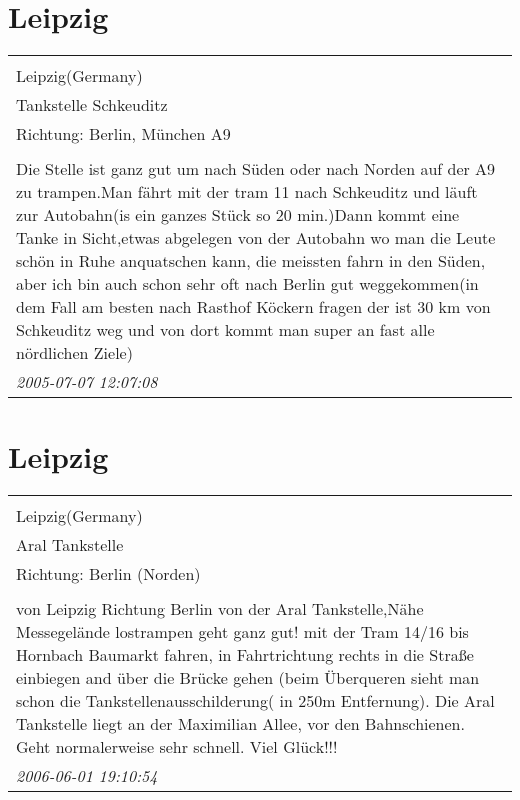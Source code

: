 \documentclass[a4paper,12pt]{article}
\begin{document}
\section{Leipzig}
\begin{tabular}{|p{13cm}|}
\hline\\
Leipzig(Germany)\\
Tankstelle Schkeuditz\\
Richtung: Berlin, München A9 \\
\hline\\
Die Stelle ist ganz gut um nach Süden oder nach Norden auf der A9 zu trampen.Man fährt mit der tram 11 nach Schkeuditz und läuft zur Autobahn(is ein ganzes Stück so 20 min.)Dann kommt eine Tanke in Sicht,etwas abgelegen von der Autobahn wo man die Leute schön in Ruhe anquatschen kann, die meissten fahrn in den Süden, aber ich bin auch schon sehr oft nach Berlin gut weggekommen(in dem Fall am besten nach Rasthof Köckern fragen der ist 30 km von Schkeuditz weg und von dort kommt man super an fast alle nördlichen Ziele) \\
\textit{ 2005-07-07 12:07:08 }\\\hline
\end{tabular}


\section{Leipzig}
\begin{tabular}{|p{13cm}|}
\hline\\
Leipzig(Germany)\\
Aral Tankstelle\\
Richtung: Berlin (Norden) \\
\hline\\
von Leipzig Richtung Berlin von der Aral Tankstelle,Nähe Messegelände lostrampen geht ganz gut!
mit der Tram 14/16 bis Hornbach Baumarkt fahren, in Fahrtrichtung rechts in die Straße einbiegen and über die Brücke gehen (beim Überqueren sieht man schon die Tankstellenausschilderung( in 250m Entfernung).
Die Aral Tankstelle liegt an der Maximilian Allee, vor den Bahnschienen. Geht normalerweise sehr schnell.
Viel Glück!!! \\
\textit{ 2006-06-01 19:10:54 }\\\hline
\end{tabular}
\end{document}
